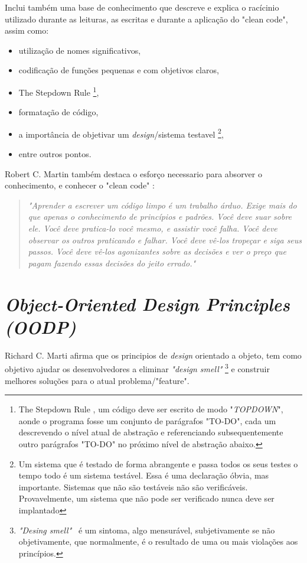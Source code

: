 \documentclass[12pt]{article}
\begin{document}
Inclui também uma base de conhecimento que descreve e explica o racícinio utilizado durante as leituras, as escritas e durante a aplicação do "clean code", assim como:
\begin{itemize}
 \item utilização de nomes significativos,
 \item codificação de funções pequenas e com objetivos claros,
 \item The Stepdown Rule \footnote{The Stepdown Rule \cite{ROBERT_MARTIN_CLEAN_CODE}, um código deve ser escrito de modo "\textit{TOPDOWN}", aonde o programa fosse um conjunto de parágrafos "TO-DO", cada um descrevendo o nível atual de abstração e referenciando subsequentemente outro parágrafos "TO-DO" no próximo nível de abstração abaixo.},
 \item formatação de código,
 \item a importância de objetivar um \textit{design}/sistema testavel \footnote{Um sistema que é testado de forma abrangente e passa todos os seus testes o tempo todo é um sistema testável. Essa é uma declaração óbvia, mas importante. Sistemas que não são testáveis
não são verificáveis. Provavelmente, um sistema que não pode ser verificado nunca deve ser implantado},
 \item entre outros pontos. 
\end{itemize}
Robert C. Martin \cite{ROBERT_MARTIN_CLEAN_CODE} também destaca o esforço necessario para absorver o conhecimento, e conhecer o "clean code" \cite{ROBERT_MARTIN_CLEAN_CODE}:

\begin{quotation}
\textit{"Aprender a escrever um código limpo é um trabalho árduo. Exige mais do que apenas o conhecimento de princípios e padrões. Você deve suar sobre ele. Você deve pratica-lo você mesmo, e assistir você falha. Você deve observar os outros praticando e falhar. Você deve vê-los tropeçar e siga seus passos. Você deve vê-los agonizantes sobre as decisões e ver o preço que pagam fazendo essas decisões do jeito errado." }
\end{quotation}

\section{\textit{Object-Oriented Design Principles (OODP)}} \label{sec:oopd}
 
 Richard C. Marti \cite{ROBERT_MARTIN_AGILE_SW_DEV_PPP} afirma que os principios de \textit{design} orientado a objeto, tem como objetivo ajudar os desenvolvedores a eliminar \textit{"design smell"} \footnote{\textit{"Desing smell"}\ \cite{ROBERT_MARTIN_AGILE_SW_DEV_PPP} é um sintoma, algo mensurável, subjetivamente se não objetivamente, que normalmente, é o resultado de uma ou mais violações aos princípios.} e construir melhores soluções para o atual problema/"feature".
\end{document}
